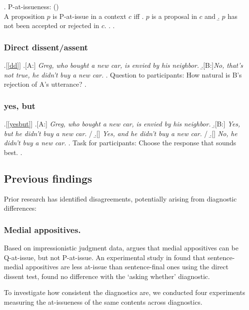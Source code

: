 \documentclass[times,linguex,xcolor]{glossa}
\begin{document}
     \ex. P-at-issueness: \hfill (\citealt{koev_apposition_2013,koev_notions_2018})\\
      A proposition $p$ is P-at-issue in a context $c$ iff
      \a. $p$ is a proposal in $c$ and
      \b. $p$ has not been accepted or rejected in $c$.
      \z.
    \z.

  \subsubsection{Direct dissent/assent}

  \ex.[\ref{dd}]
    \a.[A:] \emph{Greg, who bought a new car, is envied by his neighbor.}
    \b.[B:]\emph{No, that's not true, he didn't buy a new car.}
    \z.
  Question to participants: How natural is B's rejection of A's utterance?
  \z.

  \subsubsection{yes, but}

  \ex.[\ref{yesbut}]%
    \a.[A:] \emph{Greg, who bought a new car, is envied by his neighbor.}
    \b.[B:] \emph{Yes, but he didn't buy a new car.} /
    \b.[] \emph{Yes, and he didn't buy a new car.} /
    \b.[] \emph{No, he didn't buy a new car.}
    \z.
    Task for participants: Choose the response that sounds best.
  \z.

  \subsection{Previous findings}
    Prior research has identified disagreements, potentially arising from diagnostic differences:

    \subsubsection{Medial appositives.} Based on impressionistic judgment data, \citealt{koev_notions_2018} argues that medial appositives can be Q-at-issue, but not P-at-issue. An experimental study in \citealt{syrett_experimental_2015} found that sentence-medial appositives are less at-issue than sentence-final ones using the direct dissent test, \citealt{drozdov_projection_2024} found no difference with the `asking whether' diagnostic.

    To investigate how consistent the diagnostics are, we conducted four experiments measuring the at-issueness of the same contents across diagnostics.
    
\end{document}
